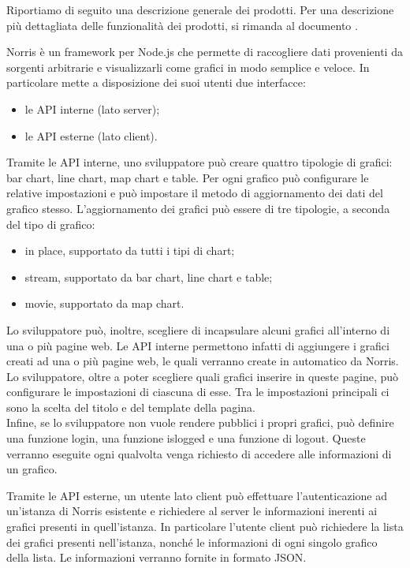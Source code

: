     Riportiamo di seguito una descrizione generale dei prodotti. Per una descrizione più dettagliata delle funzionalità dei prodotti, si rimanda al documento .

        Norris è un framework per Node.js che permette di raccogliere dati provenienti da sorgenti arbitrarie e visualizzarli come grafici in modo semplice e veloce. In particolare mette a disposizione dei suoi utenti due interfacce:
        \begin{itemize}
            \item le API interne (lato server);
            \item le API esterne (lato client).
        \end{itemize}
        
        Tramite le API interne, uno sviluppatore può creare quattro tipologie di grafici: bar chart, line chart, map chart e table. Per ogni grafico può configurare le relative impostazioni e può impostare il metodo di aggiornamento dei dati del grafico stesso. L'aggiornamento dei grafici può essere di tre tipologie, a seconda del tipo di grafico:
        \begin{itemize}
            \item in place, supportato da tutti i tipi di chart;
            \item stream, supportato da bar chart, line chart e table;
            \item movie, supportato da map chart.
        \end{itemize}
        
        Lo sviluppatore può, inoltre, scegliere di incapsulare alcuni grafici all'interno di una o più pagine web. Le API interne permettono infatti di aggiungere i grafici creati ad una o più pagine web, le quali verranno create in automatico da Norris. Lo sviluppatore, oltre a poter scegliere quali grafici inserire in queste pagine, può configurare le impostazioni di ciascuna di esse. Tra le impostazioni principali ci sono la scelta del titolo e del template della pagina.\\
        Infine, se lo sviluppatore non vuole rendere pubblici i propri grafici, può definire una funzione login, una funzione islogged e una funzione di logout. Queste verranno eseguite ogni qualvolta venga richiesto di accedere alle informazioni di un grafico.
       
            Tramite le API esterne, un utente lato client può effettuare l'autenticazione ad un'istanza di Norris esistente e richiedere al server le informazioni inerenti ai grafici presenti in quell'istanza. In particolare l'utente client può richiedere la lista dei grafici presenti nell'istanza, nonché le informazioni di ogni singolo grafico della lista. Le informazioni verranno fornite in formato JSON.

